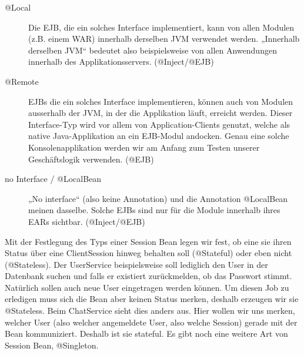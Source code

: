 \begin{description}
	\item[@Local] Die EJB, die ein solches Interface implementiert, kann von allen Modulen (z.B. einem WAR) innerhalb derselben JVM verwendet werden. „Innerhalb derselben JVM“ bedeutet also beispielsweise	von allen Anwendungen innerhalb des Applikationsservers. (@Inject/@EJB)
		
	\item[@Remote] EJBs die ein solches Interface implementieren, können auch von Modulen ausserhalb der JVM, in der die Applikation läuft, erreicht werden. Dieser Interface-Typ wird vor allem von Application-Clients	genutzt, welche als native Java-Applikation an ein EJB-Modul andocken. Genau eine solche Konsolenapplikation werden wir am	Anfang zum Testen unserer Geschäftslogik verwenden. (@EJB)
	
	\item[no Interface / @LocalBean] „No interface“ (also keine Annotation) und die Annotation	@LocalBean meinen dasselbe. Solche EJBs sind nur für die Module innerhalb ihres EARs sichtbar.	(@Inject/@EJB)
\end{description}
 
Mit der Festlegung des Typs einer Session Bean legen wir fest, ob eine sie ihren Status über eine ClientSession hinweg behalten soll (@Stateful) oder eben nicht (@Stateless). Der UserService beispielsweise
soll lediglich den User in der Datenbank suchen und falls er existiert zurückmelden, ob das Passwort stimmt. Natürlich sollen auch neue User eingetragen werden können. Um diesen Job zu erledigen muss
sich die Bean aber keinen Status merken, deshalb erzeugen wir sie @Stateless. Beim ChatService sieht dies anders aus. Hier wollen wir uns merken, welcher User (also welcher angemeldete User, also welche Session) gerade mit der Bean kommuniziert. Deshalb ist sie stateful. Es gibt noch eine weitere Art von Session Bean, @Singleton.

